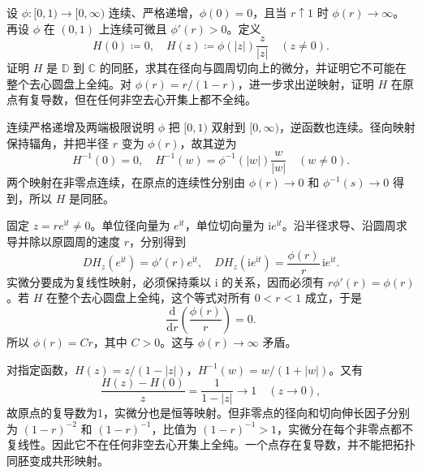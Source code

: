 \begin{exercise}[径向同胚的复微分条件]\label{b3:ex:12-1}
设 \(\phi:[0,1)\rightarrow[0,\infty)\) 连续、严格递增，\(\phi(0)=0\)，且当 \(r\uparrow1\) 时 \(\phi(r)\rightarrow\infty\)。再设 \(\phi\) 在 \((0,1)\) 上连续可微且 \(\phi'(r)>0\)。定义
\[
 H(0)\coloneqq0,\quad H(z)\coloneqq\phi(|z|)\frac{z}{|z|}\quad(z\ne0).
\]
证明 \(H\) 是 \(\mathbb D\) 到 \(\mathbb C\) 的同胚，求其在径向与圆周切向上的微分，并证明它不可能在整个去心圆盘上全纯。对 \(\phi(r)=r/(1-r)\)，进一步求出逆映射，证明 \(H\) 在原点有复导数，但在任何非空去心开集上都不全纯。
\end{exercise}
\begin{solution}
连续严格递增及两端极限说明 \(\phi\) 把 \([0,1)\) 双射到 \([0,\infty)\)，逆函数也连续。径向映射保持辐角，并把半径 \(r\) 变为 \(\phi(r)\)，故其逆为
\[
 H^{-1}(0)=0,\quad H^{-1}(w)=\phi^{-1}(|w|)\frac{w}{|w|}\quad(w\ne0).
\]
两个映射在非零点连续，在原点的连续性分别由 \(\phi(r)\rightarrow0\) 和 \(\phi^{-1}(s)\rightarrow0\) 得到，所以 \(H\) 是同胚。

固定 \(z=re^{\mathrm i t}\ne0\)。单位径向量为 \(e^{\mathrm i t}\)，单位切向量为 \(\mathrm i e^{\mathrm i t}\)。沿半径求导、沿圆周求导并除以原圆周的速度 \(r\)，分别得到
\[
 D H_z(e^{\mathrm i t})=\phi'(r)e^{\mathrm i t},\quad
 D H_z(\mathrm i e^{\mathrm i t})=\frac{\phi(r)}{r}\,\mathrm i e^{\mathrm i t}.
\]
实微分要成为复线性映射，必须保持乘以 \(\mathrm i\) 的关系，因而必须有 \(r\phi'(r)=\phi(r)\)。若 \(H\) 在整个去心圆盘上全纯，这个等式对所有 \(0<r<1\) 成立，于是
\[
 \frac{\mathrm d}{\mathrm dr}\left(\frac{\phi(r)}r\right)=0.
\]
所以 \(\phi(r)=Cr\)，其中 \(C>0\)。这与 \(\phi(r)\rightarrow\infty\) 矛盾。

对指定函数，\(H(z)=z/(1-|z|)\)，\(H^{-1}(w)=w/(1+|w|)\)。又有
\[
 \frac{H(z)-H(0)}z=\frac1{1-|z|}\longrightarrow1\quad(z\rightarrow0),
\]
故原点的复导数为1，实微分也是恒等映射。但非零点的径向和切向伸长因子分别为 \((1-r)^{-2}\) 和 \((1-r)^{-1}\)，比值为 \((1-r)^{-1}>1\)，实微分在每个非零点都不复线性。因此它不在任何非空去心开集上全纯。一个点存在复导数，并不能把拓扑同胚变成共形映射。
\end{solution}

